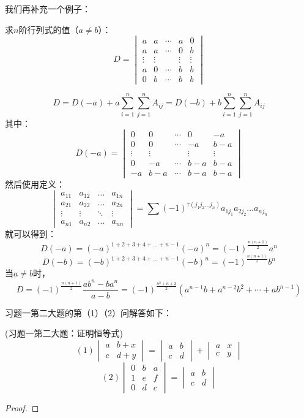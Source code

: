 我们再补充一个例子：
\begin{example}{}{}
    求$n$阶行列式的值（$a\neq b$）：\[D=\begin{vmatrix}
        a&a&\cdots&a&0\\
        a&a&\cdots&0&b\\
        \vdots&\vdots&&\vdots&\vdots\\
        a&0&\cdots&b&b\\
        0&b&\cdots&b&b\end{vmatrix}\]
\end{example}
\begin{solution}{}{}
    \[D=D(-a)+a\sum_{i=1}^n\sum_{j=1}^nA_{ij}=D(-b)+b\sum_{i=1}^n\sum_{j=1}^nA_{ij}\]
    其中：\[D(-a)=\begin{vmatrix}        
        0&0&\cdots&0&-a\\
        0&0&\cdots&-a&b-a\\
        \vdots&\vdots&&\vdots&\vdots\\
        0&-a&\cdots&b-a&b-a\\
        -a&b-a&\cdots&b-a&b-a\end{vmatrix}
    \]
    然后使用定义：
    \[\begin{vmatrix}a_{11}&a_{12}&\ldots&a_{1n}
        \\a_{21}&a_{22}&\ldots&a_{2n}\\
        \vdots&\vdots&\ddots&\vdots\\
        a_{n1}&a_{n2}&\ldots&a_{nn}\end{vmatrix}
        =\sum(-1)^{\tau(j_1j_2\ldots j_n)}a_{1j_1}a_{2j_2}\ldots a_{nj_n}\]
    就可以得到：\[D(-a)=(-a)^{1+2+3+4+...+n-1}(-a)^n=(-1)^{\frac{n(n+1)}{2}}a^n\]
    \[D(-b)=(-b)^{1+2+3+4+...+n-1}(-b)^n=(-1)^{\frac{n(n+1)}{2}}b^n\]
    当$a\neq b$时，\[D=(-1)^{\frac{n(n+1)}{2}}\frac{ab^n-ba^n}{a-b}=(-1)^{\frac{n^2+n+2}{2}}(a^{n-1}b+a^{n-2}b^2+\cdots+ab^{n-1})\]
\end{solution}
习题一第二大题的第（1）（2）问解答如下：
\begin{example}{(习题一第二大题：证明恒等式)}{}
    \[
    (1)\begin{vmatrix}
        a&b+x\\
        c&d+y
    \end{vmatrix}=\begin{vmatrix}
        a&b\\
        c&d
    \end{vmatrix}+\begin{vmatrix}
        a&x\\
        c&y
    \end{vmatrix}
    \]\[
    (2)\begin{vmatrix}
        0&b&a\\
        1&e&f\\
        0&d&c\end{vmatrix}=\begin{vmatrix}
        a&b\\
        c&d\end{vmatrix}\]
\end{example}
\begin{proof}{}{}
\end{proof}